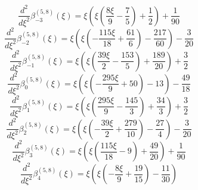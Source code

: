 \begin{equation}
\frac{d^{2}}{d\xi^{2}}\beta_{-3}^{(5,8)} (\xi) =
 \xi \left(\xi \left(\frac{8 \xi}{9} - \frac{7}{5}\right) + \frac{1}{2}\right) + \frac{1}{90}
\end{equation}
\begin{equation}
\frac{d^{2}}{d\xi^{2}}\beta_{-2}^{(5,8)} (\xi) =
 \xi \left(\xi \left(- \frac{115 \xi}{18} + \frac{61}{6}\right) - \frac{217}{60}\right) - \frac{3}{20}
\end{equation}
\begin{equation}
\frac{d^{2}}{d\xi^{2}}\beta_{-1}^{(5,8)} (\xi) =
 \xi \left(\xi \left(\frac{39 \xi}{2} - \frac{153}{5}\right) + \frac{189}{20}\right) + \frac{3}{2}
\end{equation}
\begin{equation}
\frac{d^{2}}{d\xi^{2}}\beta_{0}^{(5,8)} (\xi) =
 \xi \left(\xi \left(- \frac{295 \xi}{9} + 50\right) - 13\right) - \frac{49}{18}
\end{equation}
\begin{equation}
\frac{d^{2}}{d\xi^{2}}\beta_{1}^{(5,8)} (\xi) =
 \xi \left(\xi \left(\frac{295 \xi}{9} - \frac{145}{3}\right) + \frac{34}{3}\right) + \frac{3}{2}
\end{equation}
\begin{equation}
\frac{d^{2}}{d\xi^{2}}\beta_{2}^{(5,8)} (\xi) =
 \xi \left(\xi \left(- \frac{39 \xi}{2} + \frac{279}{10}\right) - \frac{27}{4}\right) - \frac{3}{20}
\end{equation}
\begin{equation}
\frac{d^{2}}{d\xi^{2}}\beta_{3}^{(5,8)} (\xi) =
 \xi \left(\xi \left(\frac{115 \xi}{18} - 9\right) + \frac{49}{20}\right) + \frac{1}{90}
\end{equation}
\begin{equation}
\frac{d^{2}}{d\xi^{2}}\beta_{4}^{(5,8)} (\xi) =
 \xi \left(\xi \left(- \frac{8 \xi}{9} + \frac{19}{15}\right) - \frac{11}{30}\right)
\end{equation}
